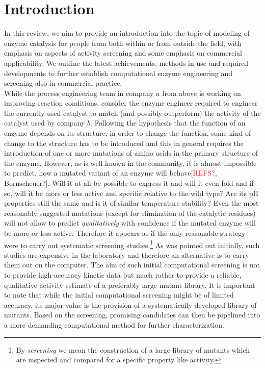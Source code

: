 \section{Introduction}\label{sec:intro}
In this review, we aim to provide an introduction into the topic of modeling of enzyme catalysis for people from both within or from outside the field, with emphasis on aspects of activity screening and some emphasis on commercial applicability.
We outline the latest achievements, methods in use and required developments to further establish computational enzyme engineering and screening also in commercial practice.\\
While the process engineering team in company $a$ from above is working on improving reaction conditions, consider the enzyme engineer required to engineer the currently used catalyst to match (and possibly outperform) the activity of the catalyst used by company $b$.
Following the hypothesis that the function of an enzyme depends on its structure, in order to change the function, some kind of change to the structure has to be introduced and this in general requires the introduction of one or more mutations of amino acids in the primary structure of the enzyme.
However, as is well known in the community, it is almost impossible to predict, how a mutated variant of an enzyme will behave[\textcolor{red}{REFS?}, Bornscheuer?].
Will it at all be possible to express it and will it even fold and if so, will it be more or less active and specific relative to the wild type?
Are its pH properties still the same and is it of similar temperature stability?
Even the most reasonably suggested mutations (except for elimination of the catalytic residues) will not allow to predict \textit{qualitatively} with confidence if the mutated enzyme will be more or less active.
Therefore it appears as if the only reasonable strategy were to carry out systematic screening studies.\footnote{By \textit{screening} we mean the construction of a large library of mutants which are inspected and compared for a specific property like activity.}
As was pointed out initially, such studies are expensive in the laboratory and therefore an alternative is to carry them out on the computer.
The aim of such initial computational screening is not to provide high-accuracy kinetic data but much rather to provide a reliable, qualitative activity estimate of a preferably large mutant library.
It is important to note that while the initial computational screening might be of limited accuracy, its major value is the provision of a systematically developed library of mutants.
Based on the screening, promising candidates can then be pipelined into a more demanding computational method for further characterization.

